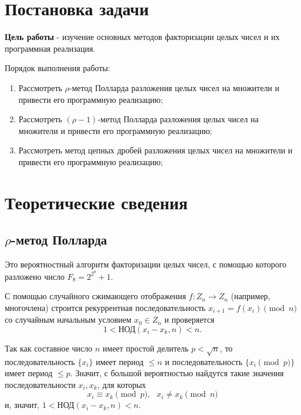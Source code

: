 \documentclass[bachelor, och, labwork]{shiza}
\begin{document}

\section{Постановка задачи}

    \textbf{Цель работы} - изучение основных методов факторизации целых чисел и
    их программная реализация. 

    Порядок выполнения работы:
    \begin{enumerate}
        \item Рассмотреть $\rho$-метод Полларда разложения целых чисел на
        множители и привести его программную реализацию;
        \item Рассмотреть $(\rho - 1)$-метод Полларда разложения целых чисел на
        множители и привести его программную реализацию;
        \item Рассмотреть метод цепных дробей разложения целых чисел на
        множители и привести его программную реализацию;
    \end{enumerate}

\section{Теоретические сведения}

    \subsection{$\rho$-метод Полларда}

        Это вероятностный алгоритм факторизации целых чисел, с помощью которого
        разложено число $F_8 = 2^{2^8} + 1$.

        С помощью случайного сжимающего отображения $f: Z_n \to Z_n$ (например,
        многочлена) строится рекуррентная последовательность $x_{i + 1} = f(x_i)
        \pmod n$ со случайным начальным условием $x_0 \in Z_n$ и проверяется $$1
        < \text{НОД}(x_i - x_k, n) < n.$$

        Так как составное число $n$ имеет простой делитель $p < \sqrt{n}$, то
        последовательность $\{x_i\}$ имеет период $\leq n$ и последовательность
        $\{x_i \pmod p\}$ имеет период $\leq p$. Значит, с большой вероятностью
        найдутся такие значения последовательности $x_i, x_k$, для которых $$x_i
        \equiv x_k \pmod p, \text{ } x_i \neq x_k \pmod n$$ и, значит, $1 <
        \text{НОД}(x_i - x_k, n) < n.$
\end{document}
